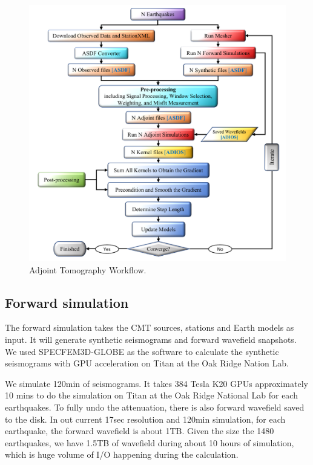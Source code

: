 \documentclass[extra,mreferee]{gji}
\begin{document}
\begin{figure}
  \centering
  \includegraphics[width=\textwidth]{figures/adjoint_workflow_6.pdf}
  \caption{Adjoint Tomography Workflow.}
  \label{fig:phase_hist}
\end{figure}

\subsection{Forward simulation}
The forward simulation takes the CMT sources, stations and Earth models as input. It will generate synthetic seismograms and forward wavefield snapshots. We used SPECFEM3D-GLOBE as the software to calculate the synthetic seismograms with GPU acceleration on Titan at the Oak Ridge Nation Lab.

We simulate 120min of seismograms. It takes 384 Tesla K20 GPUs approximately 10 mins to do the simulation on Titan at the Oak Ridge National Lab for each earthquakes. To fully undo the attenuation, there is also forward wavefield saved to the disk. In out current 17sec resolution and 120min simulation, for each earthquake, the forward wavefield is about 1TB. Given the size the 1480 earthquakes, we have 1.5TB of wavefield during about 10 hours of simulation, which is huge volume of I/O happening during the calculation.
\end{document}
